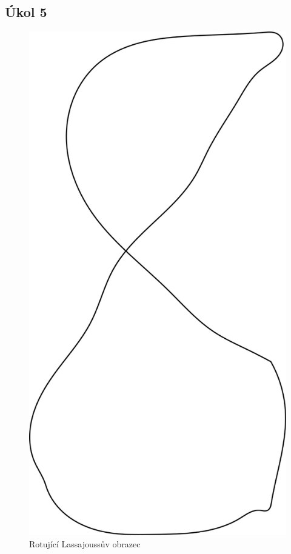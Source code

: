 \documentclass[5pt]{article}
\begin{document}
\subsection{Úkol 5}
\begin{figure}[htp]
    \centering
    \includegraphics[scale=0.35]{graph2.png}
    \caption{Rotující Lassajoussův obrazec}
    \label{}
\end{figure}
\end{document}
